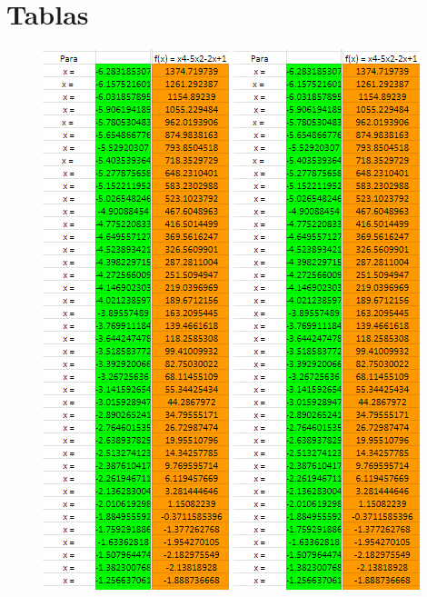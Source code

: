 \section{Tablas}

\begin{figure}[H]
    \centering
    \includegraphics[width=2.13542in,height=6.19792in]{media/image23.png}
    \includegraphics[width=2.13542in,height=6.19792in]{media/image23.png}    

\end{figure}

